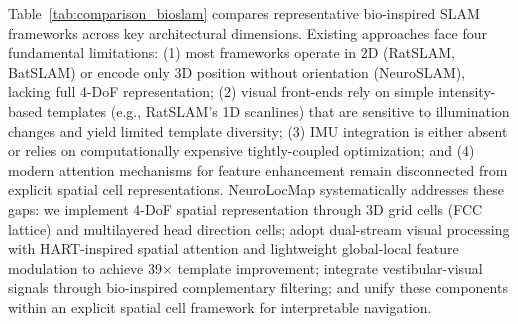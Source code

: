 Table~\ref{tab:comparison_bioslam} compares representative bio-inspired SLAM frameworks across key architectural dimensions. Existing approaches face four fundamental limitations: (1) most frameworks operate in 2D (RatSLAM, BatSLAM) or encode only 3D position without orientation (NeuroSLAM), lacking full 4-DoF representation; (2) visual front-ends rely on simple intensity-based templates (e.g., RatSLAM's 1D scanlines) that are sensitive to illumination changes and yield limited template diversity; (3) IMU integration is either absent or relies on computationally expensive tightly-coupled optimization; and (4) modern attention mechanisms for feature enhancement remain disconnected from explicit spatial cell representations. NeuroLocMap systematically addresses these gaps: we implement 4-DoF spatial representation through 3D grid cells (FCC lattice) and multilayered head direction cells; adopt dual-stream visual processing with HART-inspired spatial attention and lightweight global-local feature modulation to achieve 39$\times$ template improvement; integrate vestibular-visual signals through bio-inspired complementary filtering; and unify these components within an explicit spatial cell framework for interpretable navigation.

